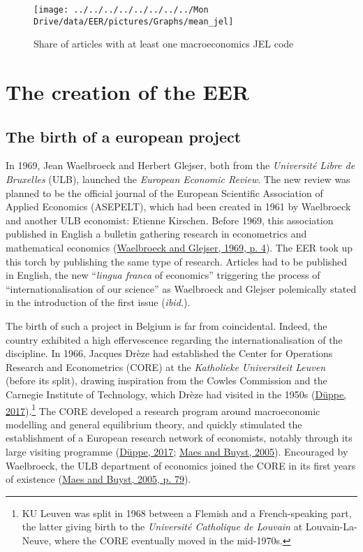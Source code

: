 \documentclass[
  12pt,
  onecolumn]{article}
\begin{document}
\begin{figure}[h]

{\centering \texttt{[image: ../../../../../../../../Mon Drive/data/EER/pictures/Graphs/mean\_jel]} 

}

\caption{Share of articles with at least one macroeconomics JEL code}\label{fig:plot-jel}
\end{figure}

\hypertarget{EER-creation}{%
\section{The creation of the EER}\label{EER-creation}}

\hypertarget{the-birth-of-a-european-project}{%
\subsection{The birth of a european
project}\label{the-birth-of-a-european-project}}

In 1969, Jean Waelbroeck and Herbert Glejser, both from the
\emph{Université Libre de Bruxelles} (ULB), launched the \emph{European
Economic Review}. The new review was planned to be the official journal
of the European Scientific Association of Applied Economics (ASEPELT),
which had been created in 1961 by Waelbroeck and another ULB economist:
Etienne Kirschen. Before 1969, this association published in English a
bulletin gathering research in econometrics and mathematical economics
(\protect\hyperlink{ref-waelbroeck1969}{Waelbroeck and Glejser, 1969, p.
4}). The EER took up this torch by publishing the same type of research.
Articles had to be published in English, the new ``\emph{lingua franca}
of economics'' triggering the process of ``internationalisation of our
science'' as Waelbroeck and Glejser polemically stated in the
introduction of the first issue (\emph{ibid.}).

The birth of such a project in Belgium is far from coincidental. Indeed,
the country exhibited a high effervescence regarding the
internationalisation of the discipline. In 1966, Jacques Drèze had
established the Center for Operations Research and Econometrics (CORE)
at the \emph{Katholieke Universiteit Leuven} (before its split), drawing
inspiration from the Cowles Commission and the Carnegie Institute of
Technology, which Drèze had visited in the 1950s
(\protect\hyperlink{ref-duppe2017}{Düppe, 2017}).\footnote{KU Leuven was
  split in 1968 between a Flemish and a French-speaking part, the latter
  giving birth to the \emph{Université Catholique de Louvain} at
  Louvain-La-Neuve, where the CORE eventually moved in the mid-1970s.}
The CORE developed a research program around macroeconomic modelling and
general equilibrium theory, and quickly stimulated the establishment of
a European research network of economists, notably through its large
visiting programme (\protect\hyperlink{ref-duppe2017}{Düppe, 2017};
\protect\hyperlink{ref-maes2005}{Maes and Buyst, 2005}). Encouraged by
Waelbroeck, the ULB department of economics joined the CORE in its first
years of existence (\protect\hyperlink{ref-maes2005}{Maes and Buyst,
2005, p. 79}).
\end{document}
